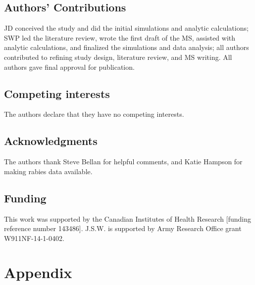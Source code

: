\documentclass[12pt]{article}
\begin{document}
\subsection*{Authors' Contributions}

JD conceived the study and did the initial simulations and analytic calculations; SWP led the literature review, wrote the first draft of the MS, assisted with analytic calculations, and finalized the simulations and data analysis; all authors contributed to refining study design, literature review, and MS writing. All authors gave final approval for publication.

\subsection*{Competing interests}

The authors declare that they have no competing interests.

\subsection*{Acknowledgments}

The authors thank Steve Bellan for helpful comments, and Katie Hampson for making rabies data available.

\subsection*{Funding}

This work was supported by the Canadian Institutes of Health Research [funding reference number 143486]. J.S.W. is supported by Army Research Office grant W911NF-14-1-0402.

\printbibliography

\clearpage

\section{Appendix}


\end{document}
